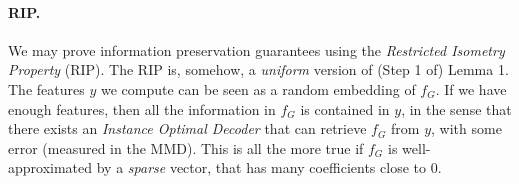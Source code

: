 \documentclass{article}
\begin{document}
\paragraph{RIP.} We may prove information preservation guarantees using the \emph{Restricted Isometry Property} (RIP). The RIP is, somehow, a \emph{uniform} version of (Step 1 of) Lemma 1. The features $y$ we compute can be seen as a random embedding of $f_G$. If we have enough features, then all the information in $f_G$ is contained in $y$, in the sense that there exists an \emph{Instance Optimal Decoder} that can retrieve $f_G$ from $y$, with some error (measured in the MMD). This is all the more true if $f_G$ is well-approximated by a \emph{sparse} vector, that has many coefficients close to $0$.
\end{document}
